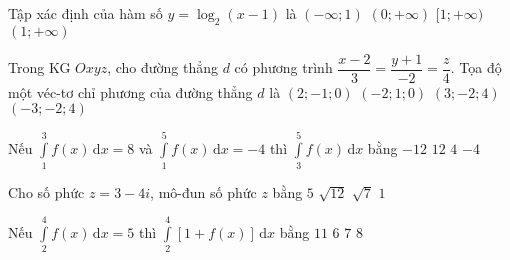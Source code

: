 \begin{ex}%
	Tập xác định của hàm số $y=\log_2(x-1)$ là
	\choice
	{$(-\infty;1)$}
	{$(0;+\infty)$}
	{$[1;+\infty)$}
	{\True $(1;+\infty)$}
\end{ex}

\begin{ex}%
	Trong KG $Oxyz$, cho đường thẳng $d$ có phương trình $\dfrac{x-2}{3}=\dfrac{y+1}{-2}=\dfrac{z}{4}$. Tọa độ một véc-tơ chỉ phương của đường thẳng $d$ là
	\choice
	{$(2;-1;0)$}
	{$(-2;1;0)$}
	{\True $(3;-2;4)$}
	{$(-3;-2;4)$}
\end{ex}

\begin{ex}%
	Nếu $\displaystyle\int\limits_1^3{f(x)\mathrm{\,d}x=8}$ và $\displaystyle\int\limits_1^5{f(x)\mathrm{\,d}x=-4}$ thì $\displaystyle\int\limits_3^5{f(x)\mathrm{\,d}x}$ bằng
	\choice
	{\True $-12$}
	{$12$}
	{$4$}
	{$-4$}
\end{ex}

\begin{ex}%
	Cho số phức $z=3-4i$, mô-đun số phức $z$ bằng
	\choice
	{\True $5$}
	{$\sqrt{12}$}
	{$\sqrt{7}$}
	{$1$}
\end{ex}

\begin{ex}%
	Nếu $\displaystyle\int\limits_2^4{f(x)\mathrm{\,d}x=5}$ thì ${\displaystyle\int\limits_2^4{\left[1+f(x)\right]\mathrm{\,d}x}}$ bằng
	\choice
	{$11$}
	{$6$}
	{\True $7$}
	{$8$}
\end{ex}


